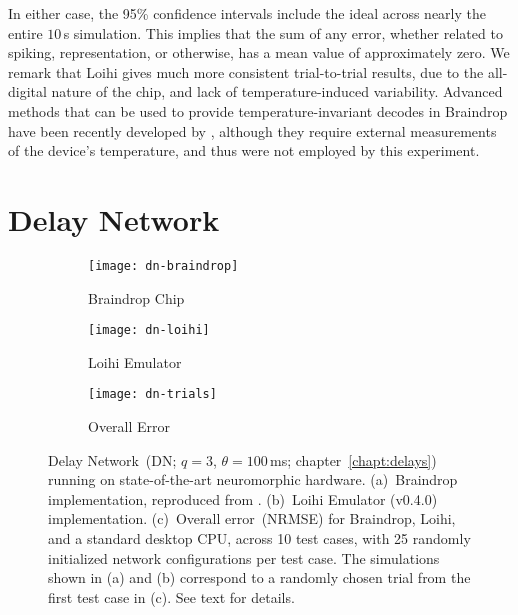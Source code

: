 
In either case, the 95\% confidence intervals include the ideal across nearly the entire $10$\,s simulation.
This implies that the sum of any error, whether related to spiking, representation, or otherwise, has a mean value of approximately zero.
We remark that Loihi gives much more consistent trial-to-trial results, due to the all-digital nature of the chip, and lack of temperature-induced variability.
Advanced methods that can be used to provide temperature-invariant decodes in Braindrop have been recently developed by \citet{reidpint2019}, although they require external measurements of the device's temperature, and thus were not employed by this experiment.

\section{Delay Network}
\label{sec:neuromorphic-dn}

\begin{figure}
  \centering
  \begin{subfigure}{.5\textwidth}
    \centering
    \texttt{[image: dn-braindrop]}
    \caption{Braindrop Chip}
    \label{fig:dn-braindrop}
  \end{subfigure}%
  \begin{subfigure}{.5\textwidth}
    \centering
    \texttt{[image: dn-loihi]}
    \caption{Loihi Emulator}
    \label{fig:dn-loihi}
  \end{subfigure}
  \begin{subfigure}{\textwidth}
    \centering
    \vspace{2em}
    \texttt{[image: dn-trials]}
    \caption{Overall Error}
    \label{fig:dn-trials}
  \end{subfigure}
  \caption{ \label{fig:dn-neuromorphic}
    Delay Network~(DN; $q=3$, $\theta=100$\,ms; chapter~\ref{chapt:delays}) running on state-of-the-art neuromorphic hardware.
    (a)~Braindrop implementation, reproduced from \citet[][Figure~16]{braindrop2019}. 
    (b)~Loihi Emulator (v0.4.0) implementation.
    (c)~Overall error~(NRMSE) for Braindrop, Loihi, and a standard desktop CPU, across 10 test cases, with 25 randomly initialized network configurations per test case.
    The simulations shown in (a) and (b) correspond to a randomly chosen trial from the first test case in (c).
    See text for details.
  }
\end{figure}


